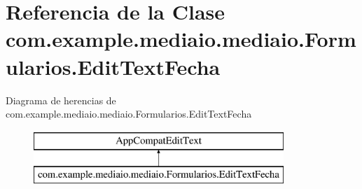 \hypertarget{classcom_1_1example_1_1mediaio_1_1mediaio_1_1_formularios_1_1_edit_text_fecha}{}\section{Referencia de la Clase com.\+example.\+mediaio.\+mediaio.\+Formularios.\+Edit\+Text\+Fecha}
\label{classcom_1_1example_1_1mediaio_1_1mediaio_1_1_formularios_1_1_edit_text_fecha}
Diagrama de herencias de com.\+example.\+mediaio.\+mediaio.\+Formularios.\+Edit\+Text\+Fecha\begin{figure}[H]
\begin{center}
\leavevmode
\includegraphics[height=2.000000cm]{classcom_1_1example_1_1mediaio_1_1mediaio_1_1_formularios_1_1_edit_text_fecha}
\end{center}
\end{figure}
